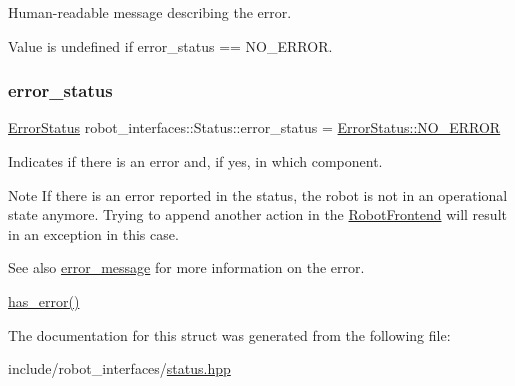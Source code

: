 Human-\/readable message describing the error. 

Value is undefined if {\ttfamily error\+\_\+status == N\+O\+\_\+\+E\+R\+R\+OR}. \mbox{\label{structrobot__interfaces_1_1Status_a80ffe66121d425d48386b39984cd4c7b}} 
\subsubsection{\texorpdfstring{error\+\_\+status}{error\_status}}
{\footnotesize\ttfamily \hyperlink{structrobot__interfaces_1_1Status_a88f1cb8387648815ca75754985bdb3b6}{Error\+Status} robot\+\_\+interfaces\+::\+Status\+::error\+\_\+status = \hyperlink{structrobot__interfaces_1_1Status_a88f1cb8387648815ca75754985bdb3b6ad306b6fdee05fe87455110ddf6501e6c}{Error\+Status\+::\+N\+O\+\_\+\+E\+R\+R\+OR}}



Indicates if there is an error and, if yes, in which component. 

\begin{DoxyNote}{Note}
If there is an error reported in the status, the robot is not in an operational state anymore. Trying to append another action in the \hyperlink{classrobot__interfaces_1_1RobotFrontend}{Robot\+Frontend} will result in an exception in this case.
\end{DoxyNote}
\begin{DoxySeeAlso}{See also}
\hyperlink{structrobot__interfaces_1_1Status_a7da10fb73cd19f2840c438d321eac744}{error\+\_\+message} for more information on the error. 

\hyperlink{structrobot__interfaces_1_1Status_a83507b0921dc1e67e690b34daa3bcbc3}{has\+\_\+error()} 
\end{DoxySeeAlso}


The documentation for this struct was generated from the following file\+:\begin{DoxyCompactItemize}
\item 
include/robot\+\_\+interfaces/\hyperlink{status_8hpp}{status.\+hpp}\end{DoxyCompactItemize}
